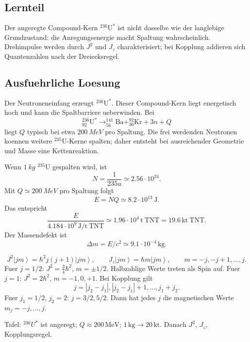 \documentclass[11pt,a4paper]{scrartcl}
\newcommand{\abs}[1]{\left|#1\right|}
\newcommand{\ket}[1]{\left|#1\right\rangle}
\newcommand{\nuclide}[3]{^{#1}_{#2}\mathrm{#3}}
\begin{document}
\subsection{Lernteil}\begin{learningbox}Der angeregte Compound-Kern \(^{236}\mathrm U^\ast\) ist nicht dasselbe wie der langlebige Grundzustand: die Anregungsenergie macht Spaltung wahrscheinlich. Drehimpulse werden durch \(J^2\) und \(J_z\) charakterisiert; bei Kopplung addieren sich Quantenzahlen nach der Dreiecksregel.\end{learningbox}
\subsection{Ausfuehrliche Loesung}
\begin{calculationbox}[title={Spaltung und Kettenreaktion}]
Der Neutroneneinfang erzeugt \(^{236}\mathrm U^\ast\). Dieser Compound-Kern liegt energetisch hoch und kann die Spaltbarriere ueberwinden. Bei
\[\nuclide{236}{92}{U}^\ast\to\nuclide{141}{56}{Ba}+\nuclide{92}{36}{Kr}+3n+Q\]
liegt \(Q\) typisch bei etwa \(\SI{200}{MeV}\) pro Spaltung. Die frei werdenden Neutronen koennen weitere \(^{235}\mathrm U\)-Kerne spalten; daher entsteht bei ausreichender Geometrie und Masse eine Kettenreaktion.
\end{calculationbox}
\begin{calculationbox}[title={Little Boy Abschaetzung}]
Wenn \(\SI{1}{kg}\) \(^{235}\mathrm U\) gespalten wird, ist
\[N=\frac{1}{235u}\simeq2.56\cdot10^{24}.\]
Mit \(Q\simeq\SI{200}{MeV}\) pro Spaltung folgt
\[E=NQ\simeq8.2\cdot10^{13}\,\mathrm J.\]
Das entspricht
\[\frac{E}{4.184\cdot10^9\,\mathrm{J/t\ TNT}}\simeq1.96\cdot10^4\,\mathrm{t\ TNT}=19.6\,\mathrm{kt\ TNT}.\]
Der Massendefekt ist
\[\Delta m=E/c^2\simeq9.1\cdot10^{-4}\,\mathrm{kg}.\]
\end{calculationbox}
\begin{calculationbox}[title={Drehimpulsformalismus}]
\[J^2\ket{jm}=\hbar^2j(j+1)\ket{jm},\qquad J_z\ket{jm}=\hbar m\ket{jm},\qquad m=-j,-j+1,\dots,j.\]
Fuer \(j=1/2\): \(J^2=\frac34\hbar^2\), \(m=\pm1/2\). Halbzahlige Werte treten als Spin auf. Fuer \(j=1\): \(J^2=2\hbar^2\), \(m=-1,0,+1\). Bei Kopplung gilt
\[j=\abs{j_2-j_1},\abs{j_2-j_1}+1,\dots,j_1+j_2.\]
Fuer \(j_1=1/2\), \(j_2=2\): \(j=3/2,5/2\). Dann hat jedes \(j\) die magnetischen Werte \(m_j=-j,\dots,j\).
\end{calculationbox}
\begin{talkbox}Tafel: \(^{236}U^\ast\) ist angeregt; \(Q\approx200\,\mathrm{MeV}\); \(1\,\mathrm{kg}\to20\,\mathrm{kt}\). Danach \(J^2\), \(J_z\), Kopplungsregel.\end{talkbox}
\end{document}
